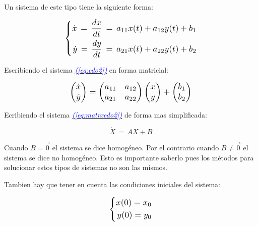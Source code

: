 \documentclass[12pt,a4paper]{report} %
\newcommand{\eref}[1]{\hyperref[#1]{\textcolor{blue}{\textit{(\ref*{#1})}}}}
\begin{document}
	Un sistema de este tipo tiene la siguiente forma:
	
	\begin{equation}
		\label{eq:edo2}
		\scalebox{1.2}{$\displaystyle
			\left\{
			\begin{aligned}
				\dot{x}\,=\,\frac{dx}{dt}\,=\,a_{11}x(t)+a_{12}y(t)+b_1 \\
				\dot{y}\,=\,\frac{dy}{dt}\,=\,a_{21}x(t)+a_{22}y(t)+b_2
			\end{aligned}
			\right.
			$}
	\end{equation}\smallskip
	
	Escribiendo el sistema \eref{eq:edo2} en forma matricial:
	
	\begin{equation}
		\label{eq:matrxedo2}
		\scalebox{1.2}{$\displaystyle
		\begin{pmatrix}
			\dot{x}\\
			\dot{y}\\
		\end{pmatrix} =
		\begin{pmatrix}
			a_{11} & a_{12}\\
		    a_{21} & a_{22}\\
		\end{pmatrix} 
		\begin{pmatrix}
			x\\
			y\\
		\end{pmatrix} + 
		\begin{pmatrix}
			b_1\\
			b_2\\
		\end{pmatrix}
		$}
	\end{equation} \smallskip
	
	Ecribiendo el sistema \eref{eq:matrxedo2} de forma mas simplificada:
	
	\begin{equation}
		\label{eq:sisautonomo}
		\dot{X}\,=\,AX+B
	\end{equation}\smallskip
	
	Cuando $B=\vec{0}$ el sistema se dice homogéneo. Por el contrario cuando $B\neq\vec{0}$ el sistema se dice no homogéneo. Esto es importante saberlo pues los métodos para solucionar estos tipos de sistemas no son las mismos.
	
	Tambien hay que tener en cuenta las condiciones iniciales del sistema:
	
	\begin{equation}
		\label{eq:ci}
		\scalebox{1.2}{$\displaystyle
			\left\{
			\begin{aligned}
				x(0)=x_0 \\
			    y(0)=y_0
			\end{aligned}
			\right.
			$}
	\end{equation}\smallskip
	
\end{document}
